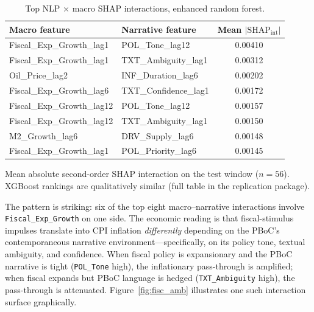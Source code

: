\documentclass[AER]{AEA}
\begin{document}
\begin{table}[tbp]
\caption{Top NLP $\times$ macro SHAP interactions, enhanced random forest.\label{tab:shap_int}}
\centering
\begin{tabular}{llc}
\toprule
Macro feature & Narrative feature & Mean $|\text{SHAP}_{\text{int}}|$ \\
\midrule
Fiscal\_Exp\_Growth\_lag1  & POL\_Tone\_lag12         & 0.00410 \\
Fiscal\_Exp\_Growth\_lag1  & TXT\_Ambiguity\_lag1     & 0.00312 \\
Oil\_Price\_lag2           & INF\_Duration\_lag6      & 0.00202 \\
Fiscal\_Exp\_Growth\_lag6  & TXT\_Confidence\_lag1    & 0.00172 \\
Fiscal\_Exp\_Growth\_lag12 & POL\_Tone\_lag12         & 0.00157 \\
Fiscal\_Exp\_Growth\_lag12 & TXT\_Ambiguity\_lag1     & 0.00150 \\
M2\_Growth\_lag6           & DRV\_Supply\_lag6        & 0.00148 \\
Fiscal\_Exp\_Growth\_lag1  & POL\_Priority\_lag6      & 0.00145 \\
\bottomrule
\end{tabular}
\begin{tablenotes}
Mean absolute second-order SHAP interaction on the test window
($n=56$). XGBoost rankings are qualitatively similar (full table in the
replication package).
\end{tablenotes}
\end{table}

The pattern is striking: six of the top eight macro--narrative interactions
involve \texttt{Fiscal\_Exp\_Growth} on one side. The economic reading is
that fiscal-stimulus impulses translate into CPI inflation \emph{differently}
depending on the PBoC's contemporaneous narrative environment---specifically,
on its policy tone, textual ambiguity, and confidence. When fiscal policy
is expansionary and the PBoC narrative is tight (\texttt{POL\_Tone} high),
the inflationary pass-through is amplified; when fiscal expands but PBoC
language is hedged (\texttt{TXT\_Ambiguity} high), the pass-through is
attenuated. Figure~\ref{fig:fisc_amb} illustrates one such interaction
surface graphically.
\end{document}

